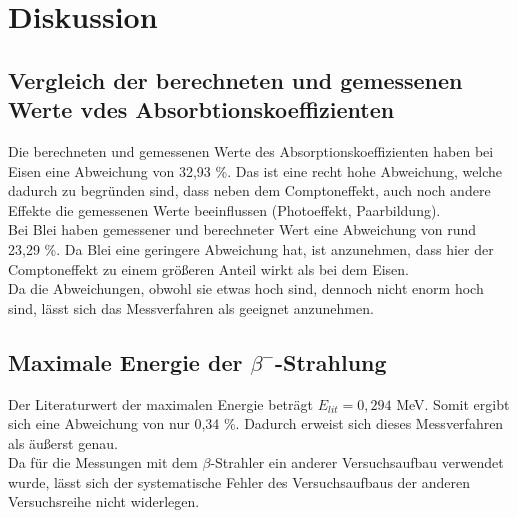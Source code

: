\section{Diskussion}
\label{sec:Diskussion}
\subsection{Vergleich der berechneten und gemessenen Werte vdes Absorbtionskoeffizienten}

Die berechneten und gemessenen Werte des Absorptionskoeffizienten haben bei Eisen eine Abweichung von 32,93 \%. 
Das ist eine recht hohe Abweichung, welche dadurch zu begründen sind, dass neben dem Comptoneffekt, auch noch andere
Effekte die gemessenen Werte beeinflussen (Photoeffekt, Paarbildung).\\
Bei Blei haben gemessener und berechneter Wert eine Abweichung von rund 23,29 \%. Da Blei eine geringere Abweichung
hat, ist anzunehmen, dass hier der Comptoneffekt zu einem größeren Anteil wirkt als bei dem Eisen.\\
Da die Abweichungen, obwohl sie etwas hoch sind, dennoch nicht enorm hoch sind, lässt sich das Messverfahren
als geeignet anzunehmen.\\

\subsection{Maximale Energie der \texorpdfstring{$\beta^-$}{Beta}-Strahlung}

Der Literaturwert der maximalen Energie beträgt $E_{lit} = 0,294 $ MeV. Somit ergibt sich eine Abweichung von nur
0,34 \%. Dadurch erweist sich dieses Messverfahren als äußerst genau.\\
Da für die Messungen mit dem $\beta$-Strahler ein anderer Versuchsaufbau verwendet wurde, lässt sich der systematische
Fehler des Versuchsaufbaus der anderen Versuchsreihe nicht widerlegen.
